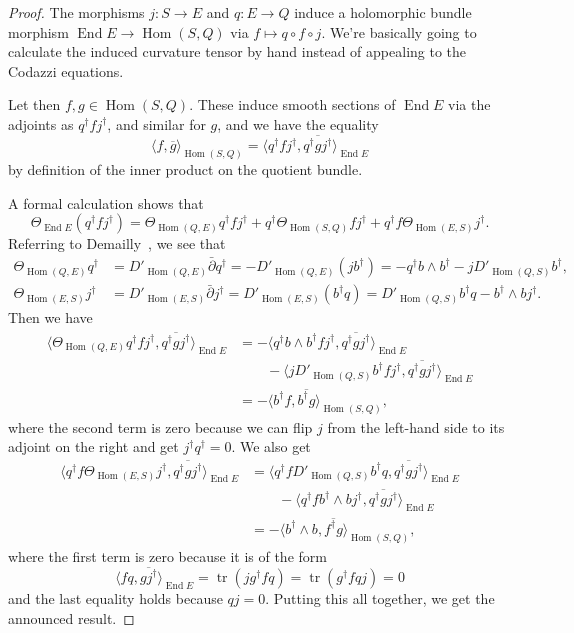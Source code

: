 \documentclass[10pt,a4paper]{article}
\newtheorem*{proof}{Proof}
\def\ov#1{\overline{#1}}
\DeclareMathOperator{\End}{End}
\DeclareMathOperator{\Hom}{Hom}
\DeclareMathOperator{\tr}{tr}
\begin{document}
\begin{proof}
The morphisms $j : S \to E$ and $q : E \to Q$ induce a holomorphic bundle morphism $\End E \to \Hom(S,Q)$ via $f \mapsto q \circ f \circ j$. We're basically going to calculate the induced curvature tensor by hand instead of appealing to the Codazzi equations.

Let then $f,g \in \Hom(S,Q)$. These induce smooth sections of $\End E$ via the adjoints as $q^\dagger f j^\dagger$, and similar for $g$, and we have the equality
\[
\langle f, \ov g \rangle_{\Hom(S,Q)}
= \langle q^\dagger f j^\dagger, \ov{q^\dagger g j^\dagger} \rangle_{\End E}
\]
by definition of the inner product on the quotient bundle.

A formal calculation shows that
\[
\Theta_{\End E} (q^\dagger f j^\dagger)
= \Theta_{\Hom(Q,E)} q^\dagger f j^\dagger
+ q^\dagger \Theta_{\Hom(S,Q)} f j^\dagger
+ q^\dagger f \Theta_{\Hom(E,S)} j^\dagger.
\]
Referring to Demailly~\cite[Theorem~14.3]{demailly-complex}, we see that
\begin{align*}
\Theta_{\Hom(Q,E)} q^\dagger
&= D'_{\Hom(Q,E)} \bar\partial q^\dagger
= -D'_{\Hom(Q,E)} (j b^\dagger)
= -q^\dagger b \wedge b^\dagger - j D'_{\Hom(Q,S)}b^\dagger,
\\
\Theta_{\Hom(E,S)} j^\dagger
&= D'_{\Hom(E,S)} \bar\partial j^\dagger
= D'_{\Hom(E,S)}(b^\dagger q)
= D'_{\Hom(Q,S)}b^\dagger q - b^\dagger \wedge b j^\dagger.
\end{align*}
Then we have
\begin{align*}
\langle \Theta_{\Hom(Q,E)} q^\dagger f j^\dagger, \ov{q^\dagger g j^\dagger} \rangle_{\End E}
&= -\langle q^\dagger b \wedge b^\dagger f j^\dagger, \ov{q^\dagger g j^\dagger} \rangle_{\End E}
\\
&\qquad - \langle j D'_{\Hom(Q,S)}b^\dagger f j^\dagger, \ov{q^\dagger g j^\dagger} \rangle_{\End E}
\\
&= -\langle b^\dagger f, \ov{b^\dagger g} \rangle_{\Hom(S,Q)},
\end{align*}
where the second term is zero because we can flip $j$ from the left-hand side to its adjoint on the right and get $j^\dagger q^\dagger = 0$. We also get
\begin{align*}
\langle q^\dagger f \Theta_{\Hom(E,S)} j^\dagger, \ov{q^\dagger g j^\dagger} \rangle_{\End E}
&= \langle q^\dagger f D'_{\Hom(Q,S)}b^\dagger q , \ov{q^\dagger g j^\dagger} \rangle_{\End E}
\\
&\qquad
- \langle q^\dagger f b^\dagger \wedge b j^\dagger, \ov{q^\dagger g j^\dagger} \rangle_{\End E}
\\
&= - \langle b^\dagger \wedge b, \ov{f^\dagger g} \rangle_{\Hom(S,Q)},
\end{align*}
where the first term is zero because it is of the form
\[
\langle f q, \ov{g j^\dagger} \rangle_{\End E}
= \tr(j g^\dagger f q)
= \tr(g^\dagger f q j) = 0
\]
and the last equality holds because $q j = 0$.
Putting this all together, we get the announced result.
\end{proof}
\end{document}
